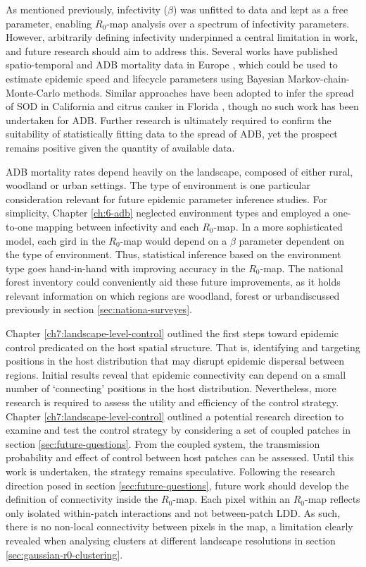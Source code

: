 As mentioned previously, infectivity ($\beta$) was unfitted to data and kept as a free parameter, enabling $R_0$-map analysis over a spectrum of infectivity parameters. 
However, arbitrarily defining infectivity underpinned a central limitation in work, and future research should aim to address this. 
Several works have published spatio-temporal and ADB mortality data in Europe \cite{https://doi.org/10.1111/1365-2745.13383, https://doi.org/10.1002/ppp3.11, stocks2017first, lohmus2014ash}, which could be used to estimate epidemic speed and lifecycle parameters using Bayesian Markov-chain-Monte-Carlo methods.
Similar approaches have been adopted to infer the spread of SOD in California \cite{10.1371/journal.pcbi.1002328} and citrus canker in Florida \cite{neri2014bayesian}, though no such work has been undertaken for ADB.
Further research is ultimately required to confirm the suitability of statistically fitting data to the spread of ADB, yet the prospect remains positive given the quantity of available data.

ADB mortality rates depend heavily on the landscape, composed of either rural, woodland or urban settings.
The type of environment is one particular consideration relevant for future epidemic parameter inference studies.
For simplicity, Chapter \ref{ch:6-adb} neglected environment types and employed a one-to-one mapping between infectivity and each $R_0$-map. In a more sophisticated model, each gird in the $R_0$-map would depend on a $\beta$ parameter dependent on the type of environment.
Thus, statistical inference based on the environment type goes hand-in-hand with improving accuracy in the $R_0$-map.
The national forest inventory could conveniently aid these future improvements, as it holds relevant information on which regions are woodland, forest or urban\textemdash discussed previously in section \ref{sec:nationa-surveyes}.

Chapter \ref{ch7:landscape-level-control} outlined the first steps toward epidemic control predicated on the host spatial structure. That is, identifying and targeting positions in the host distribution that may disrupt epidemic dispersal between regions. Initial results reveal that epidemic connectivity can depend on a small number of `connecting' positions in the host distribution. Nevertheless, more research is required to assess the utility and efficiency of the control strategy. Chapter \ref{ch7:landscape-level-control}
outlined a potential research direction to examine and test the control strategy by considering a set of coupled patches in section \ref{sec:future-questions}. From the coupled system, the transmission probability and effect of control between host patches can be assessed. Until this work is undertaken, the strategy remains speculative.
Following the research direction posed in section \ref{sec:future-questions}, future work should develop the definition of connectivity inside the $R_0$-map. Each pixel within an $R_0$-map reflects only isolated within-patch interactions and not between-patch LDD. As such, there is no non-local connectivity between pixels in the map, 
a limitation clearly revealed when analysing clusters at different landscape resolutions in section \ref{sec:gaussian-r0-clustering}.

